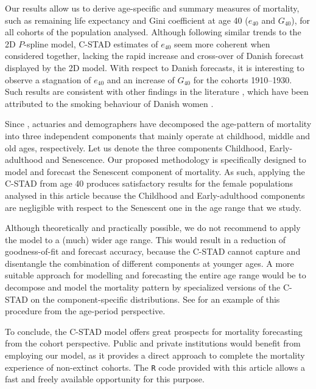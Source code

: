 \documentclass[11pt, a4paper]{article}
\begin{document}
Our results allow us to derive age-specific and summary measures of mortality, such as remaining life expectancy and Gini coefficient at age 40 ($e_{40}$ and $G_{40}$), for all cohorts of the population analysed. Although following similar trends to the 2D $P$-spline model, C-STAD estimates of $e_{40}$ seem more coherent when considered together, lacking the rapid increase and cross-over of Danish forecast displayed by the 2D model. With respect to Danish forecasts, it is interesting to observe a stagnation of $e_{40}$ and an increase of $G_{40}$ for the cohorts 1910--1930. Such results are consistent with other findings in the literature \cite[see, e.g., Fig.~4 in][]{jacobsen2002long}, which have been attributed to the smoking behaviour of Danish women \citep{jacobsen2006causes,lindahl2016did}. 

{\color{red}
Since \cite{thiele1871mathematical}, actuaries and demographers have decomposed the age-pattern of mortality into three independent components that mainly operate at childhood, middle and old ages, respectively. Let us denote the three components Childhood, Early-adulthood and Senescence. Our proposed methodology is specifically designed to model and forecast the Senescent component of mortality. As such, applying the C-STAD from age 40 produces satisfactory results for the female populations analysed in this article because the Childhood and Early-adulthood components are negligible with respect to the Senescent one in the age range that we study. 
	
Although theoretically and practically possible, we do not recommend to apply the model to a (much) wider age range. This would result in a reduction of goodness-of-fit and forecast accuracy, because the C-STAD cannot capture and disentangle the combination of different components at younger ages. A more suitable approach for modelling and forecasting the entire age range would be to decompose and model the mortality pattern by specialized versions of the C-STAD on the component-specific distributions. See \cite{basellini2019three} for an example of this procedure from the age-period perspective.
}

To conclude, the C-STAD model offers great prospects for mortality forecasting from the cohort perspective. {\color{red}Public and private institutions would benefit from employing our model, as it} provides a direct approach to complete the mortality experience  of non-extinct cohorts. The \texttt{R} code provided with this article allows a fast and freely available opportunity for this purpose. 
\end{document}
